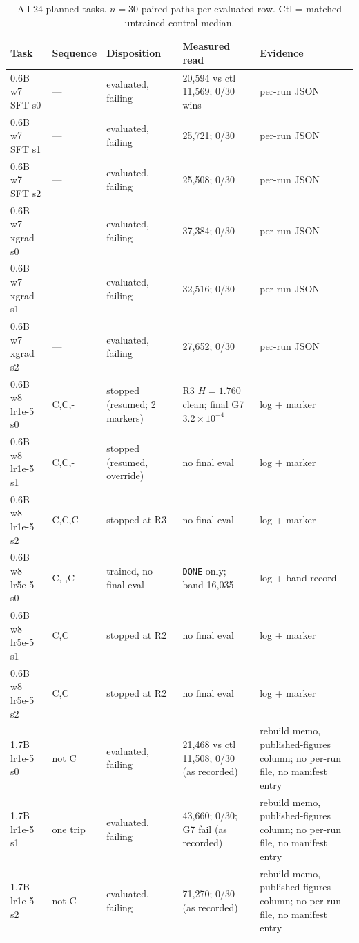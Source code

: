 \documentclass[11pt,a4paper]{article}
\begin{document}
\begin{table}[h]
\centering
\footnotesize
\caption{All 24 planned tasks. $n{=}30$ paired paths per evaluated row. Ctl = matched untrained
control median.}
\label{tab:s3}
\begin{tabular}{@{}p{2.35cm}p{2.0cm}p{2.6cm}p{3.5cm}p{3.2cm}@{}}
\toprule
\textbf{Task} & \textbf{Sequence} & \textbf{Disposition} & \textbf{Measured read} & \textbf{Evidence} \\
\midrule
0.6B w7 SFT s0 & --- & evaluated, failing & 20{,}594 vs ctl 11{,}569; 0/30 wins & per-run JSON \\
0.6B w7 SFT s1 & --- & evaluated, failing & 25{,}721; 0/30 & per-run JSON \\
0.6B w7 SFT s2 & --- & evaluated, failing & 25{,}508; 0/30 & per-run JSON \\
0.6B w7 xgrad s0 & --- & evaluated, failing & 37{,}384; 0/30 & per-run JSON \\
0.6B w7 xgrad s1 & --- & evaluated, failing & 32{,}516; 0/30 & per-run JSON \\
0.6B w7 xgrad s2 & --- & evaluated, failing & 27{,}652; 0/30 & per-run JSON \\
\midrule
0.6B w8 lr1e-5 s0 & C,C,- & stopped (resumed; 2 markers) & R3 $H{=}1.760$ clean; final G7 $3.2\times10^{-4}$ & log + marker \\
0.6B w8 lr1e-5 s1 & C,C,- & stopped (resumed, override) & no final eval & log + marker \\
0.6B w8 lr1e-5 s2 & C,C,C & stopped at R3 & no final eval & log + marker \\
0.6B w8 lr5e-5 s0 & C,-,C & trained, no final eval & \texttt{DONE} only; band 16{,}035 & log + band record \\
0.6B w8 lr5e-5 s1 & C,C & stopped at R2 & no final eval & log + marker \\
0.6B w8 lr5e-5 s2 & C,C & stopped at R2 & no final eval & log + marker \\
\midrule
1.7B lr1e-5 s0 & not C & evaluated, failing & 21{,}468 vs ctl 11{,}508; 0/30 (as recorded) & rebuild memo, published-figures column; no per-run file, no manifest entry \\
1.7B lr1e-5 s1 & one trip & evaluated, failing & 43{,}660; 0/30; G7 fail (as recorded) & rebuild memo, published-figures column; no per-run file, no manifest entry \\
1.7B lr1e-5 s2 & not C & evaluated, failing & 71{,}270; 0/30 (as recorded) & rebuild memo, published-figures column; no per-run file, no manifest entry \\

\end{tabular}
\end{table}
\end{document}
